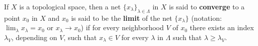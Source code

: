 If $X$ is a topological space, then a net $\{x_\lambda\}_{\lambda \in \Lambda}$ in $X$ is said to \textbf{converge} to a point $x_0$ in $X$ and $x_0$ is said to be the \textbf{limit} of the net $\{x_\lambda\}$ (notation: $\lim_\lambda x_\lambda = x_0$ or $x_\lambda \rightarrow x_0$) if for every neighborhood $V$ of $x_0$ there exists an index $\lambda_V$, depending on $V$, such that $x_\lambda \in V$ for every $\lambda$ in $\Lambda$ such that $\lambda \geq \lambda_V$.
